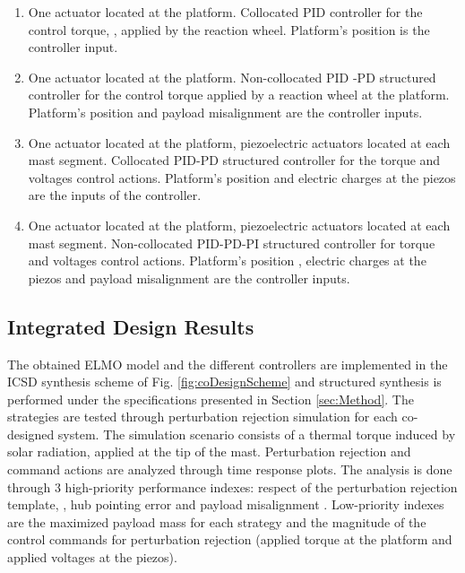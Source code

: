 \documentclass{ifacconf}
\begin{document}
\begin{enumerate}[I]
\item One actuator located at the platform. Collocated PID controller for the control torque, , applied by the reaction wheel. Platform's position  is the controller input.

\item One actuator located at the platform. Non-collocated PID -PD structured controller for the control torque applied by a reaction wheel at the platform. Platform's position  and payload misalignment  are the controller inputs.


\item One actuator located at the platform, piezoelectric actuators located at each mast segment. Collocated PID-PD structured controller for the torque and voltages control actions. Platform's position  and electric charges  at the piezos are the inputs of the controller.

\item One actuator located at the platform, piezoelectric actuators located at each mast segment. Non-collocated PID-PD-PI structured controller for torque and voltages control actions. Platform's position , electric charges  at the piezos and payload misalignment are the controller inputs.

\end{enumerate}


\subsection{Integrated Design Results}

The obtained ELMO model and the different controllers are implemented in the ICSD synthesis scheme of Fig. \ref{fig:coDesignScheme} and structured  synthesis is performed under the specifications presented in Section \ref{sec:Method}. The strategies are tested through perturbation rejection simulation for each co-designed system. The simulation scenario consists of a thermal torque induced by solar radiation, applied at the tip of the mast. Perturbation rejection and command actions are analyzed through time response plots. The analysis is done through 3 high-priority performance indexes: respect of the perturbation rejection template, , hub pointing error  and payload misalignment . Low-priority indexes are the maximized payload mass for each strategy and the magnitude of the control commands for perturbation rejection (applied torque at the platform and applied voltages at the piezos).
\end{document}
